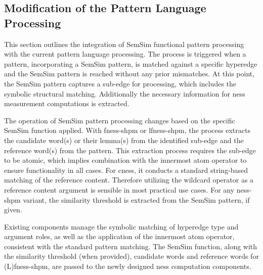 \documentclass[11pt, numbers=noenddot]{scrreprt}
\begin{document}
\subsection{Modification of the Pattern Language Processing}
\label{sec:modifications-pattern-language-processing}
This section outlines the integration of SemSim functional pattern processing with the current pattern language processing. The process is triggered when a pattern, incorporating a SemSim pattern, is matched against a specific hyperedge and the SemSim pattern is reached without any prior mismatches. At this point, the SemSim pattern captures a sub-edge for processing, which includes the symbolic structural matching. 
Additionally the necessary information for \gls{ness} measurement computations is extracted.

The operation of SemSim pattern processing changes based on the specific SemSim function applied. With \gls{fness-shpm} or \gls{lfness-shpm}, the process extracts the candidate word(s) or their lemma(s) from the identified sub-edge and the reference word(s) from the pattern. This extraction process requires the sub-edge to be atomic, which implies combination with the innermost atom operator to ensure functionality in all cases. For \gls{cness}, it conducts a standard string-based matching of the reference content. Therefore  utilizing the wildcard operator as a reference content argument is sensible in most practical use cases. For any \gls{ness-shpm} variant, the similarity threshold is extracted from the SemSim pattern, if given.

Existing components manage the symbolic matching of hyperedge type and argument roles, as well as the application of the innermost atom operator, consistent with the standard pattern matching. The SemSim function, along with the similarity threshold (when provided), candidate words and reference words for (L)\gls{fness-shpm}, are passed to the newly designed \gls{ness} computation components.
\end{document}
